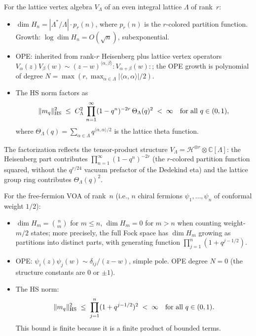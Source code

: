 \begin{computation}
\label{comp:thqg-I-hs-lattice}
For the lattice vertex algebra $V_\Lambda$ of an even integral lattice $\Lambda$ of rank~$r$:
\begin{itemize}
\item $\dim H_n = |\Lambda^*/\Lambda| \cdot p_r(n)$, where $p_r(n)$ is the $r$-colored partition function. Growth: $\log \dim H_n = O(\sqrt{n})$, subexponential.
\item OPE: inherited from rank-$r$ Heisenberg plus lattice vertex operators $V_\alpha(z)V_\beta(w) \sim (z-w)^{\langle\alpha,\beta\rangle}:\!V_{\alpha+\beta}(w)\!:$; the OPE growth is polynomial of degree $N = \max(r, \max_{\alpha \in \Lambda}|\langle\alpha,\alpha\rangle|/2)$.
\item The HS norm factors as
 \begin{equation}\label{eq:thqg-I-hs-lattice-norm}
 \|m_q\|_{\operatorname{HS}}^2 \;\leq\; C_\Lambda^2\,\prod_{n=1}^\infty(1-q^n)^{-2r} \,\Theta_\Lambda(q)^2 \;<\; \infty \quad\text{for all } q \in (0,1),
 \end{equation}
 where $\Theta_\Lambda(q) = \sum_{\alpha \in \Lambda} q^{\langle\alpha,\alpha\rangle/2}$ is the lattice theta function.
\end{itemize}
The factorization reflects the tensor-product structure $V_\Lambda = \mathcal{H}^{\otimes r} \otimes \mathbb{C}[\Lambda]$: the Heisenberg part contributes $\prod_{n=1}^\infty(1-q^n)^{-2r}$ (the $r$-colored partition function squared, without the $q^{r/24}$ vacuum prefactor of the Dedekind eta) and the lattice group ring contributes $\Theta_\Lambda(q)^2$.
\end{computation}

\begin{computation}
\label{comp:thqg-I-hs-fermion}
For the free-fermion VOA of rank~$n$ (i.e., $n$ chiral fermions $\psi_1, \ldots, \psi_n$ of conformal weight $1/2$):
\begin{itemize}
\item $\dim H_m = \binom{n}{m}$ for $m \leq n$, $\dim H_m = 0$ for $m > n$ when counting weight-$m/2$ states; more precisely, the full Fock space has $\dim H_m$ growing as partitions into distinct parts, with generating function $\prod_{j=1}^n (1 + q^{j-1/2})$.
\item OPE: $\psi_i(z)\psi_j(w) \sim \delta_{ij}/(z-w)$, simple pole. OPE degree $N = 0$ (the structure constants are $0$ or $\pm 1$).
\item The HS norm:
 \begin{equation}\label{eq:thqg-I-hs-fermion-norm}
 \|m_q\|_{\operatorname{HS}}^2 \;\leq\; \prod_{j=1}^{n} (1 + q^{j-1/2})^2 \;<\; \infty \quad\text{for all } q \in (0,1).
 \end{equation}
 This bound is finite because it is a finite product of bounded terms.
\end{itemize}
\end{computation}


